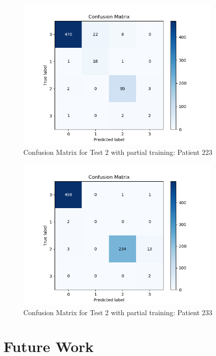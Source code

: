 \documentclass[LaM,binding=0.6cm]{sapthesis}
\begin{document}
\begin{figure}[H]  \centering
	\includegraphics[width=100mm,scale=0.7]{patient223-transfer-learn-nontrainable}
	\caption{Confusion Matrix for Test 2 with partial training: Patient 223}
	\label{fig:patient223-transfer-learn-nontrainable}
\end{figure}
\begin{figure}[H]  \centering
	\includegraphics[width=100mm,scale=0.7]{patient233-transfer-learn-nontrainable}
	\caption{Confusion Matrix for Test 2 with partial training: Patient 233}
	\label{fig:patient233-transfer-learn-nontrainable}
\end{figure}










\chapter{Future Work}















\backmatter
\cleardoublepage
{}
\end{document}
